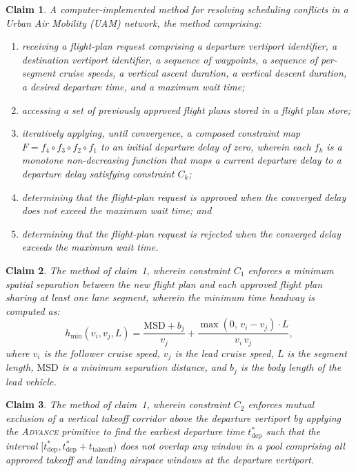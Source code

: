 \documentclass[12pt,a4paper]{article}
\newtheorem{claim}{Claim}
\newcommand{\MSD}{\mathrm{MSD}}
\newcommand{\hmin}{h_{\min}}
\newcommand{\tdep}{t_{\mathrm{dep}}}
\newcommand{\tto}{t_{\mathrm{takeoff}}}
\begin{document}
\begin{claim}
A computer-implemented method for resolving scheduling conflicts in a Urban Air
Mobility (UAM) network, the method comprising:
\begin{enumerate}[label=\alph*)]
  \item receiving a flight-plan request comprising a departure vertiport
    identifier, a destination vertiport identifier, a sequence of waypoints, a
    sequence of per-segment cruise speeds, a vertical ascent duration, a
    vertical descent duration, a desired departure time, and a maximum wait
    time;
  \item accessing a set of previously approved flight plans stored in a flight
    plan store;
  \item iteratively applying, until convergence, a composed constraint map
    $F = f_4 \circ f_3 \circ f_2 \circ f_1$ to an initial departure delay of
    zero, wherein each $f_k$ is a monotone non-decreasing function that maps a
    current departure delay to a departure delay satisfying constraint $C_k$;
  \item determining that the flight-plan request is approved when the converged
    delay does not exceed the maximum wait time; and
  \item determining that the flight-plan request is rejected when the converged
    delay exceeds the maximum wait time.
\end{enumerate}
\end{claim}

\begin{claim}
The method of claim~1, wherein constraint $C_1$ enforces a minimum spatial
separation between the new flight plan and each approved flight plan sharing at
least one lane segment, wherein the minimum time headway is computed as:
\[
  \hmin(v_i, v_j, L) =
    \frac{\MSD + b_j}{v_j}
    + \frac{\max(0,\, v_i - v_j)\cdot L}{v_i\, v_j},
\]
where $v_i$ is the follower cruise speed, $v_j$ is the lead cruise speed, $L$
is the segment length, $\MSD$ is a minimum separation distance, and $b_j$ is
the body length of the lead vehicle.
\end{claim}

\begin{claim}
The method of claim~1, wherein constraint $C_2$ enforces mutual exclusion of a
vertical takeoff corridor above the departure vertiport by applying the
\textsc{Advance} primitive to find the earliest departure time $\tdep^*$ such
that the interval $[\tdep^*, \tdep^* + \tto)$ does not overlap any window in
a pool comprising all approved takeoff and landing airspace windows at the
departure vertiport.
\end{claim}
\end{document}
